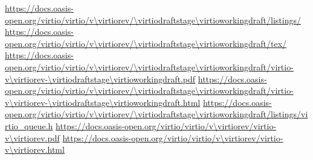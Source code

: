 
\newcommand{\virtioversion}{Virtual I/O Device (VIRTIO) Version \virtiorev}
\newcommand{\virtiospecfile}{virtio-v\virtiorev-\virtiodraftstage\virtioworkingdraft}
\newcommand{\virtiourlbase}{https://docs.oasis-open.org/virtio/virtio/v\virtiorev/\virtiodraftstage\virtioworkingdraft}
\urldef \virtiourllistings\url{\virtiourlbase/listings/}
\urldef \virtiourltex\url{\virtiourlbase/tex/}
\urldef \virtiourlpdf\url{\virtiourlbase/\virtiospecfile.pdf}
\urldef \virtiourlhtml\url{\virtiourlbase/\virtiospecfile.html}
\urldef \virtiourlh\url{\virtiourlbase/listings/virtio_queue.h}
\urldef \virtiourllatestpdf\url{https://docs.oasis-open.org/virtio/virtio/v\virtiorev/virtio-v\virtiorev.pdf}
\urldef \virtiourllatesthtml\url{https://docs.oasis-open.org/virtio/virtio/v\virtiorev/virtio-v\virtiorev.html}
\newcommand{\virtioworkproduct}{Standards Track Work Product}
\newcommand{\virtiooasiscopyright}{Copyright © OASIS Open 2018. All Rights Reserved.}

